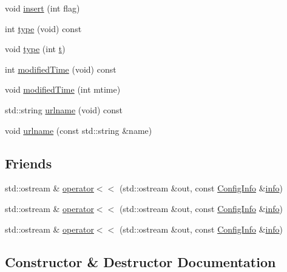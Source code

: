 \begin{DoxyCompactItemize}
void \mbox{\hyperlink{classFILEDB_1_1ConfigInfo_a59ae164a1b55687a88e37d876c4f05f6}{insert}} (int flag)
\item 
int \mbox{\hyperlink{classFILEDB_1_1ConfigInfo_a8053fc6dd889fb1e7c888359412fc0c7}{type}} (void) const
\item 
void \mbox{\hyperlink{classFILEDB_1_1ConfigInfo_a8d65b3b00e90f7daa4ab65fae36ed024}{type}} (int \mbox{\hyperlink{adat__devel_2lib_2hadron_2hadron__timeslice_8cc_ac310d9181e916ba43604099aee272c71}{t}})
\item 
int \mbox{\hyperlink{classFILEDB_1_1ConfigInfo_a03212f15d26edbae21ea53bbce2b1793}{modified\+Time}} (void) const
\item 
void \mbox{\hyperlink{classFILEDB_1_1ConfigInfo_a5c250fc2d94faafa05f18d8126ccf0cb}{modified\+Time}} (int mtime)
\item 
std\+::string \mbox{\hyperlink{classFILEDB_1_1ConfigInfo_aae1f3e5b2bd95afcd655b4df4548dc1f}{urlname}} (void) const
\item 
void \mbox{\hyperlink{classFILEDB_1_1ConfigInfo_a49750ae80347780d48415cb7aac9a068}{urlname}} (const std\+::string \&name)
\end{DoxyCompactItemize}
\subsection*{Friends}
\begin{DoxyCompactItemize}
\item 
std\+::ostream \& \mbox{\hyperlink{classFILEDB_1_1ConfigInfo_a2aa453414301c12055ae76f2bfdc8f87}{operator$<$$<$}} (std\+::ostream \&out, const \mbox{\hyperlink{classFILEDB_1_1ConfigInfo}{Config\+Info}} \&\mbox{\hyperlink{structinfo}{info}})
\item 
std\+::ostream \& \mbox{\hyperlink{classFILEDB_1_1ConfigInfo_a2aa453414301c12055ae76f2bfdc8f87}{operator$<$$<$}} (std\+::ostream \&out, const \mbox{\hyperlink{classFILEDB_1_1ConfigInfo}{Config\+Info}} \&\mbox{\hyperlink{structinfo}{info}})
\item 
std\+::ostream \& \mbox{\hyperlink{classFILEDB_1_1ConfigInfo_a2aa453414301c12055ae76f2bfdc8f87}{operator$<$$<$}} (std\+::ostream \&out, const \mbox{\hyperlink{classFILEDB_1_1ConfigInfo}{Config\+Info}} \&\mbox{\hyperlink{structinfo}{info}})
\end{DoxyCompactItemize}


\subsection{Constructor \& Destructor Documentation}
\mbox{\label{classFILEDB_1_1ConfigInfo_a5aa818d39aeb907f27e064cab48c3522}} 
